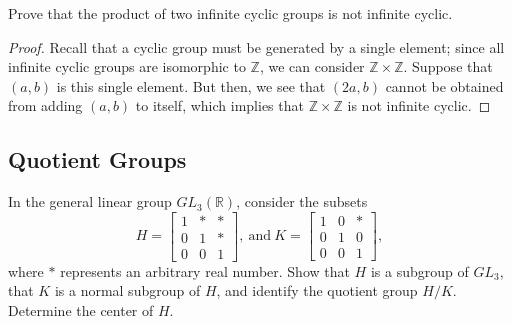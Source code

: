 \documentclass[12pt]{article}
\theoremstyle{remark}
\newcommand{\GL}{\mathit{GL}}
\begin{document}
\setcounter{subsubsection}{2}
\begin{problem}
  Prove that the product of two infinite cyclic groups is not infinite cyclic.
\end{problem}
\begin{proof}
  Recall that a cyclic group must be generated by a single element; since all infinite cyclic groups are isomorphic to $\mathbb{Z}$, we can consider $\mathbb{Z} \times \mathbb{Z}$. Suppose that $(a,b)$ is this single element. But then, we see that $(2a,b)$ cannot be obtained from adding $(a,b)$ to itself, which implies that $\mathbb{Z} \times \mathbb{Z}$ is not infinite cyclic.
\end{proof}

\subsection{Quotient Groups}
\setcounter{subsubsection}{1}
\begin{problem}
  In the general linear group $\GL_3(\mathbb{R})$, consider the subsets
  \begin{equation*}
    H = \begin{bmatrix}
      1 & * & *\\
      0 & 1 & *\\
      0 & 0 & 1
    \end{bmatrix},
    ~\text{and}~
    K = \begin{bmatrix}
      1 & 0 & *\\
      0 & 1 & 0\\
      0 & 0 & 1
    \end{bmatrix},
  \end{equation*}
  where $*$ represents an arbitrary real number. Show that $H$ is a subgroup of $\GL_3$, that $K$ is a normal subgroup of $H$, and identify the quotient group $H/K$. Determine the center of $H$.
\end{problem}
\end{document}
